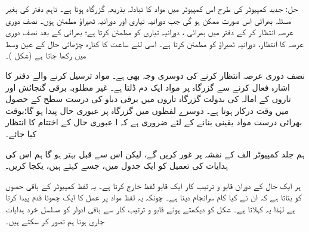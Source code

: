 حل:\quad
جدید کمپیوٹر کی طرح اس کمپیوٹر میں مواد کا تبادلہ بذریعہ   گزرگاہ ہوتا ہے۔ تاہم دفتر  کی بغیر مسئلہ  بھرائی اس صورت ممکن ہو گی  جب دورانیہ تیاری اور  دورانیہ  ٹھیراؤ  مطمئن ہوں۔ نصف  دوری عرصہ انتظار   کر  کے دفتر میں  بھرائی ، دورانیہ تیاری کو مطمئن کرتا ہے؛ بھرائی کے بعد نصف دوری عرصہ کا انتظار، دورانیہ ٹھیراؤ کو مطمئن کرتا ہے۔ اسی لئے ساعت کا کنارہ چڑھائی   حال کے عین وسط میں رکھا جاتا ہے (شکل  )۔

نصف دوری عرصہ انتظار کرنے کی  دوسری وجہ بھی ہے۔ مواد ترسیل کرنے والے دفتر کا    اشارہ فعال کرنے  سے  گزرگاہ  پر مواد ایک دم ڈلتا ہے۔ غیر مطلوبہ  برقی گنجائش اور تاروں کے    امالہ کی بدولت  گزرگاہ  تاروں میں برقی دباو کی درست  سطح  کے حصول میں وقت درکار ہوتا ہے۔ دوسرے لفظوں میں    گزرگاہ  پر عبوری حال   پیدا ہو گا؛بوقت بھرائی درست مواد یقینی بنانے کے لئے ضروری ہے کہ  ا عبوری حال  کے اختتام  کا  انتظار کیا جائے۔

ہم جلد  کمپیوٹر    الف کے   نقشہ  پر غور کریں گے، لیکن اس سے قبل بہتر ہو گا ہم اس کی ہدایات کی تعمیل کو ایک  جدول میں،  جسے کہتے ہیں،  یکجا کریں۔

ہر ایک  حال کے دوران قابو و ترتیب کار ایک قابو لفظ خارج کرتا ہے۔ یہ  لفظ  کمپیوٹر کے باقی حصوں کو  بتاتا ہے کہ ان  نے کیا کام سرانجام دینا ہے۔ چونکہ   یہ  لفظ مواد پر عمل  کا ایک چھوٹا قدم  پیدا کرتا ہے لہٰذا یہ  کہلاتا ہے۔ شکل  کو دیکھتے ہوئے   قابو و ترتیب کار سے باقی ادوار کو مسلسل خرد ہدایات جاری ہونا  ہم تصور کر سکتے ہیں۔

